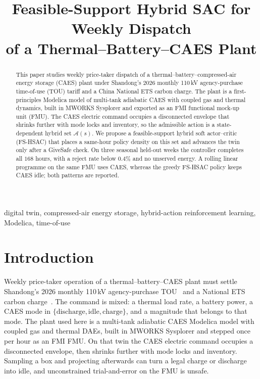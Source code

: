 \documentclass[conference]{IEEEtran}
\begin{document}
\title{Feasible-Support Hybrid SAC for Weekly Dispatch\\of a Thermal--Battery--CAES Plant}

\author{
}

\maketitle

\begin{abstract}
This paper studies weekly price-taker dispatch of a thermal--battery--compressed-air energy storage (CAES) plant under Shandong's 2026 monthly 110\,kV agency-purchase time-of-use (TOU) tariff and a China National ETS carbon charge. The plant is a first-principles Modelica model of multi-tank adiabatic CAES with coupled gas and thermal dynamics, built in MWORKS Sysplorer and exported as an FMI functional mock-up unit (FMU). The CAES electric command occupies a disconnected envelope that shrinks further with mode locks and inventory, so the admissible action is a state-dependent hybrid set \(\mathcal{A}(s)\). We propose a feasible-support hybrid soft actor--critic (FS-HSAC) that places a same-hour policy density on this set and advances the twin only after a GiveSafe check. On three seasonal held-out weeks the controller completes all \(168\) hours, with a reject rate below \(0.4\%\) and no unserved energy. A rolling linear programme on the same FMU uses CAES, whereas the greedy FS-HSAC policy keeps CAES idle; both patterns are reported.
\end{abstract}

\begin{IEEEkeywords}
digital twin, compressed-air energy storage, hybrid-action reinforcement learning, Modelica, time-of-use
\end{IEEEkeywords}

\section{Introduction}

Weekly price-taker operation of a thermal--battery--CAES plant must settle Shandong's 2026 monthly 110\,kV agency-purchase TOU~\cite{shandong2026tou} and a National ETS carbon charge~\cite{mee2025etsnews}. The command is mixed: a thermal load rate, a battery power, a CAES mode in \(\{\mathrm{discharge},\mathrm{idle},\mathrm{charge}\}\), and a magnitude that belongs to that mode. The plant used here is a multi-tank adiabatic CAES Modelica model with coupled gas and thermal DAEs, built in MWORKS Sysplorer and stepped once per hour as an FMI FMU. On that twin the CAES electric command occupies a disconnected envelope, then shrinks further with mode locks and inventory. Sampling a box and projecting afterwards can turn a legal charge or discharge into idle, and unconstrained trial-and-error on the FMU is unsafe.
\end{document}
